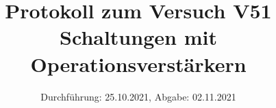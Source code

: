 \titlehead{\texttt{[image: ressources/logo.jpg]}}
\title{Protokoll zum Versuch V51 \\ Schaltungen mit Operationsverstärkern}
\date{Durchführung: 25.10.2021, Abgabe: 02.11.2021}


